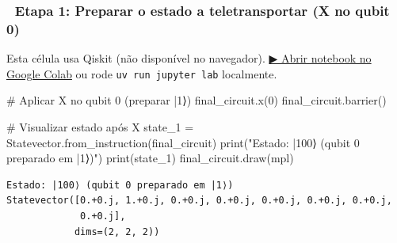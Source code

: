 \documentclass[
  brazilian,
]{report}
\newenvironment{Shaded}{\begin{snugshade}}{\end{snugshade}}
\newcommand{\BuiltInTok}[1]{\textcolor[rgb]{0.00,0.23,0.31}{#1}}
\newcommand{\CommentTok}[1]{\textcolor[rgb]{0.37,0.37,0.37}{#1}}
\newcommand{\DecValTok}[1]{\textcolor[rgb]{0.68,0.00,0.00}{#1}}
\newcommand{\NormalTok}[1]{\textcolor[rgb]{0.00,0.23,0.31}{#1}}
\newcommand{\OperatorTok}[1]{\textcolor[rgb]{0.37,0.37,0.37}{#1}}
\newcommand{\StringTok}[1]{\textcolor[rgb]{0.13,0.47,0.30}{#1}}
\begin{document}
\subsubsection{🔹 Etapa 1: Preparar o estado a teletransportar (X no
qubit
0)}\label{etapa-1-preparar-o-estado-a-teletransportar-x-no-qubit-0}

\begin{tcolorbox}[enhanced jigsaw, arc=.35mm, bottomrule=.15mm, bottomtitle=1mm, breakable, colback=white, colbacktitle=quarto-callout-warning-color!10!white, colframe=quarto-callout-warning-color-frame, coltitle=black, left=2mm, leftrule=.75mm, opacityback=0, opacitybacktitle=0.6, rightrule=.15mm, title=\textcolor{quarto-callout-warning-color}{\faExclamationTriangle}\hspace{0.5em}{⚛️ Célula Qiskit --- execute no Colab ou localmente}, titlerule=0mm, toprule=.15mm, toptitle=1mm]

Esta célula usa Qiskit (não disponível no navegador).
\href{https://colab.research.google.com/github/maxwellamaral/aula-quantum/blob/main/notebooks/02-teletransport.ipynb}{▶
Abrir notebook no Google Colab} ou rode \texttt{uv\ run\ jupyter\ lab}
localmente.

\begin{Shaded}
\begin{Highlighting}[]

\CommentTok{\# Aplicar X no qubit 0 (preparar |1⟩)}
\NormalTok{final\_circuit.x(}\DecValTok{0}\NormalTok{)}
\NormalTok{final\_circuit.barrier()}

\CommentTok{\# Visualizar estado após X}
\NormalTok{state\_1 }\OperatorTok{=}\NormalTok{ Statevector.from\_instruction(final\_circuit)}
\BuiltInTok{print}\NormalTok{(}\StringTok{"Estado: |100⟩ (qubit 0 preparado em |1⟩)"}\NormalTok{)}
\BuiltInTok{print}\NormalTok{(state\_1)}
\NormalTok{final\_circuit.draw(}\StringTok{\textquotesingle{}mpl\textquotesingle{}}\NormalTok{)}
\end{Highlighting}
\end{Shaded}

\end{tcolorbox}

\begin{verbatim}
Estado: |100⟩ (qubit 0 preparado em |1⟩)
Statevector([0.+0.j, 1.+0.j, 0.+0.j, 0.+0.j, 0.+0.j, 0.+0.j, 0.+0.j,
             0.+0.j],
            dims=(2, 2, 2))
\end{verbatim}
\end{document}
